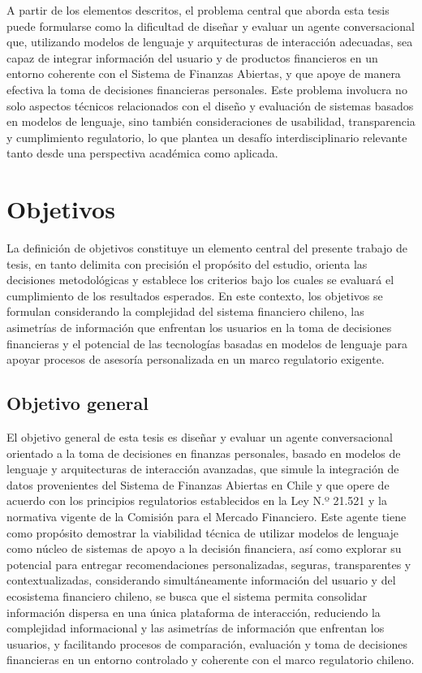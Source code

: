 \documentclass[
	spanish, %
	letterpaper, oneside
]{book}
\begin{document}
A partir de los elementos descritos, el problema central que aborda esta tesis puede formularse como la dificultad de diseñar y evaluar un agente conversacional que, utilizando modelos de lenguaje y arquitecturas de interacción adecuadas, sea capaz de integrar información del usuario y de productos financieros en un entorno coherente con el Sistema de Finanzas Abiertas, y que apoye de manera efectiva la toma de decisiones financieras personales. Este problema involucra no solo aspectos técnicos relacionados con el diseño y evaluación de sistemas basados en modelos de lenguaje, sino también consideraciones de usabilidad, transparencia y cumplimiento regulatorio, lo que plantea un desafío interdisciplinario relevante tanto desde una perspectiva académica como aplicada.


\section{Objetivos}

La definición de objetivos constituye un elemento central del presente trabajo de tesis, en tanto delimita con precisión el propósito del estudio, orienta las decisiones metodológicas y establece los criterios bajo los cuales se evaluará el cumplimiento de los resultados esperados. En este contexto, los objetivos se formulan considerando la complejidad del sistema financiero chileno, las asimetrías de información que enfrentan los usuarios en la toma de decisiones financieras y el potencial de las tecnologías basadas en modelos de lenguaje para apoyar procesos de asesoría personalizada en un marco regulatorio exigente.

\subsection{Objetivo general}

El objetivo general de esta tesis es diseñar y evaluar un agente conversacional orientado a la toma de decisiones en finanzas personales, basado en modelos de lenguaje y arquitecturas de interacción avanzadas, que simule la integración de datos provenientes del Sistema de Finanzas Abiertas en Chile y que opere de acuerdo con los principios regulatorios establecidos en la Ley N.º 21.521 y la normativa vigente de la Comisión para el Mercado Financiero. Este agente tiene como propósito demostrar la viabilidad técnica de utilizar modelos de lenguaje como núcleo de sistemas de apoyo a la decisión financiera, así como explorar su potencial para entregar recomendaciones personalizadas, seguras, transparentes y contextualizadas, considerando simultáneamente información del usuario y del ecosistema financiero chileno, se busca que el sistema permita consolidar información dispersa en una única plataforma de interacción, reduciendo la complejidad informacional y las asimetrías de información que enfrentan los usuarios, y facilitando procesos de comparación, evaluación y toma de decisiones financieras en un entorno controlado y coherente con el marco regulatorio chileno. 
\end{document}
